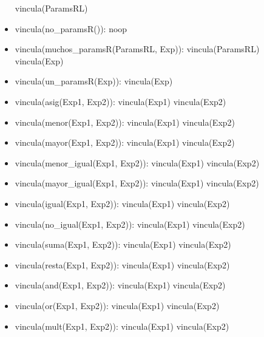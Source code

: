 \documentclass[11pt]{article}
\begin{document}
\begin{itemize}
                    \subitem vincula(ParamsRL)
                \item vincula(no\_paramsR()): 
                    \subitem noop
                \item vincula(muchos\_paramsR(ParamsRL, Exp)): 
                    \subitem vincula(ParamsRL) 
                    \subitem vincula(Exp)
                \item vincula(un\_paramsR(Exp)): 
                    \subitem vincula(Exp)
                \item vincula(asig(Exp1, Exp2)): 
                    \subitem vincula(Exp1) 
                    \subitem vincula(Exp2)
                \item vincula(menor(Exp1, Exp2)): 
                    \subitem vincula(Exp1) 
                    \subitem vincula(Exp2)
                \item vincula(mayor(Exp1, Exp2)): 
                    \subitem vincula(Exp1) 
                    \subitem vincula(Exp2)
                \item vincula(menor\_igual(Exp1, Exp2)): 
                    \subitem vincula(Exp1) 
                    \subitem vincula(Exp2)
                \item vincula(mayor\_igual(Exp1, Exp2)): 
                    \subitem vincula(Exp1) 
                    \subitem vincula(Exp2)
                \item vincula(igual(Exp1, Exp2)): 
                    \subitem vincula(Exp1) 
                    \subitem vincula(Exp2)
                \item vincula(no\_igual(Exp1, Exp2)): 
                    \subitem vincula(Exp1) 
                    \subitem vincula(Exp2)
                \item vincula(suma(Exp1, Exp2)): 
                    \subitem vincula(Exp1) 
                    \subitem vincula(Exp2)
                \item vincula(resta(Exp1, Exp2)): 
                    \subitem vincula(Exp1) 
                    \subitem vincula(Exp2)
                \item vincula(and(Exp1, Exp2)): 
                    \subitem vincula(Exp1) 
                    \subitem vincula(Exp2)
                \item vincula(or(Exp1, Exp2)): 
                    \subitem vincula(Exp1) 
                    \subitem vincula(Exp2)
                \item vincula(mult(Exp1, Exp2)): 
                    \subitem vincula(Exp1) 
                    \subitem vincula(Exp2)

\end{itemize}
\end{document}
